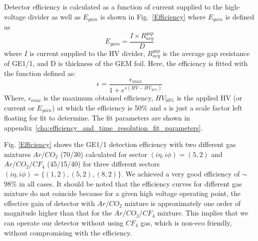Detector efficiency is calculated as a function of current supplied to the high-voltage divider as well as $E_{gain}$ is shown in Fig.~\ref{Efficiency} where $E_{gain}$ is defined as
\begin{equation}
E_{gain} = \frac{I\times R_{avg}^{gap}}{D}
\end{equation}
where $I$ is current supplied to the HV divider, $R_{avg}^{gap}$ is the average gap resistance of GE1/1, and D is thickness of the GEM foil.
Here, the efficiency is fitted with the function defined as:
\begin{equation}
    \epsilon = \frac{\epsilon_{max}}{1+e^{s(HV-HV_{50\%})}}
\end{equation}
Where, $\epsilon_{max}$ is the maximum obtained efficiency, $HV_{50\%}$ is the applied HV (or current or $E_{gain}$) at which the efficiency is 50\% and $s$ is just a scale factor left floating for fit to determine. The fit parameters are shown in appendix~\ref{cha:efficiency_and_time_resolution_fit_parameters}.

Fig. \ref{Efficiency} shows the GE1/1 detection efficiency with two different gas mixtures $Ar/CO_2$ (70/30) calculated for sector $(i\eta,i\phi)=(5,2)$ and $Ar/CO_2/CF_4$ (45/15/40) for three different sectors $(i\eta,i\phi)=\{(1,2),(5,2),(8,2)\}$.
We achieved a very good efficiency of $\sim$ 98\% in all cases.
It should be noted that the efficiency curves for different gas mixture do not coincide because for a given high voltage operating point, the effective gain of detector with $Ar/CO_2$  mixture is approximately one order of magnitude higher than that for the $Ar/CO_2/CF_4$ mixture.
This implies that we can operate our detector without using $CF_4$ gas, which is non-eco friendly, without compromising with the efficiency.
      

